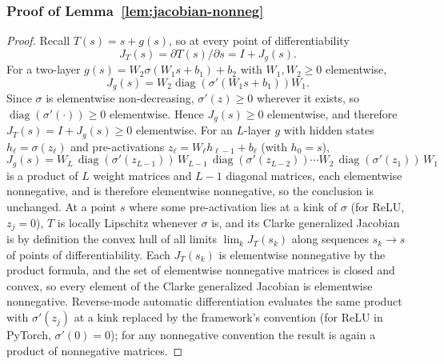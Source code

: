 \documentclass{article}
\theoremstyle{plain}
\theoremstyle{definition}
\theoremstyle{remark}
\theoremstyle{plain}
\begin{document}
\subsubsection{Proof of Lemma~\ref{lem:jacobian-nonneg}}

\label{prf:jac}
\begin{proof}
Recall $T(s)=s+g(s)$, so at every point of differentiability
\[
J_T(s)=\partial T(s)/\partial s=I + J_g(s).
\]
For a two-layer $g(s)=W_2 \sigma(W_1 s + b_1)+b_2$ with $W_1,W_2\ge 0$ elementwise,
\[
J_g(s)=W_2 \operatorname{diag}(\sigma'(W_1 s + b_1)) W_1.
\]
Since $\sigma$ is elementwise non-decreasing, $\sigma'(z)\ge 0$ wherever it exists,
so $\operatorname{diag}(\sigma'(\cdot))\ge 0$ elementwise. Hence $J_g(s)\ge 0$
elementwise, and therefore $J_T(s)=I+J_g(s)\ge 0$ elementwise.
For an $L$-layer $g$ with hidden states $h_\ell = \sigma(z_\ell)$ and pre-activations
$z_\ell = W_\ell h_{\ell-1} + b_\ell$ (with $h_0 = s$),
\[
J_g(s)=W_L\,\operatorname{diag}(\sigma'(z_{L-1}))\,W_{L-1}\,\operatorname{diag}(\sigma'(z_{L-2}))\cdots W_2\,\operatorname{diag}(\sigma'(z_1))\,W_1
\]
is a product of
$L$ weight matrices and $L-1$ diagonal matrices, each elementwise nonnegative, and is
therefore elementwise nonnegative, so the conclusion is unchanged. At a point $s$ where
some pre-activation lies at a kink of $\sigma$ (for ReLU, $z_j = 0$), $T$ is locally
Lipschitz whenever $\sigma$ is, and its Clarke generalized Jacobian is by definition the
convex hull of all limits $\lim_k J_T(s_k)$ along sequences $s_k \to s$ of points of
differentiability. Each $J_T(s_k)$ is elementwise nonnegative by the product formula,
and the set of elementwise nonnegative matrices is closed and convex, so every element
of the Clarke generalized Jacobian is elementwise nonnegative. Reverse-mode automatic
differentiation evaluates the same product with $\sigma'(z_j)$ at a kink replaced by the
framework's convention (for ReLU in PyTorch, $\sigma'(0)=0$); for any nonnegative
convention the result is again a product of nonnegative matrices.
\end{proof}
\end{document}
